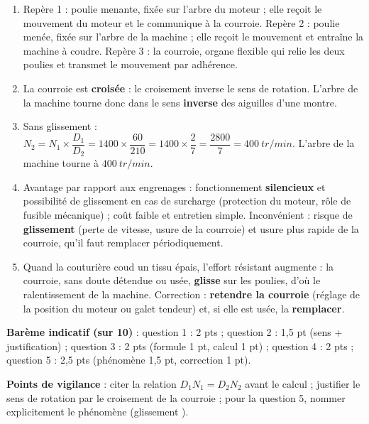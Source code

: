 \documentclass[11pt]{article}
\newcommand{\cle}[1]{{\popxbold\color{popdark}#1}}
\begin{document}
\begin{corrige}
\begin{enumerate}
\item Repère 1 : poulie \cle{menante}, fixée sur l'arbre du moteur ; elle reçoit le mouvement du moteur et le communique à la courroie. Repère 2 : poulie \cle{menée}, fixée sur l'arbre de la machine ; elle reçoit le mouvement et entraîne la machine à coudre. Repère 3 : la \cle{courroie}, organe flexible qui relie les deux poulies et transmet le mouvement par adhérence.
\item La courroie est \textbf{croisée} : le croisement inverse le sens de rotation. L'arbre de la machine tourne donc dans le sens \textbf{inverse} des aiguilles d'une montre.
\item Sans glissement : $N_2 = N_1 \times \dfrac{D_1}{D_2} = 1400 \times \dfrac{60}{210} = 1400 \times \dfrac{2}{7} = \dfrac{2800}{7} = \SI{400}{tr/min}$. L'arbre de la machine tourne à $\SI{400}{tr/min}$.
\item Avantage par rapport aux engrenages : fonctionnement \textbf{silencieux} et possibilité de glissement en cas de surcharge (protection du moteur, rôle de fusible mécanique) ; coût faible et entretien simple. Inconvénient : risque de \textbf{glissement} (perte de vitesse, usure de la courroie) et usure plus rapide de la courroie, qu'il faut remplacer périodiquement.
\item Quand la couturière coud un tissu épais, l'effort résistant augmente : la courroie, sans doute détendue ou usée, \textbf{glisse} sur les poulies, d'où le ralentissement de la machine. Correction : \textbf{retendre la courroie} (réglage de la position du moteur ou galet tendeur) et, si elle est usée, la \textbf{remplacer}.
\end{enumerate}
\textbf{Barème indicatif (sur 10)} : question 1 : 2 pts ; question 2 : 1,5 pt (sens + justification) ; question 3 : 2 pts (formule 1 pt, calcul 1 pt) ; question 4 : 2 pts ; question 5 : 2,5 pts (phénomène 1,5 pt, correction 1 pt).

\textbf{Points de vigilance} : citer la relation $D_1 N_1 = D_2 N_2$ avant le calcul ; justifier le sens de rotation par le croisement de la courroie ; pour la question 5, nommer explicitement le phénomène (\og glissement \fg).
\end{corrige}
\end{document}
